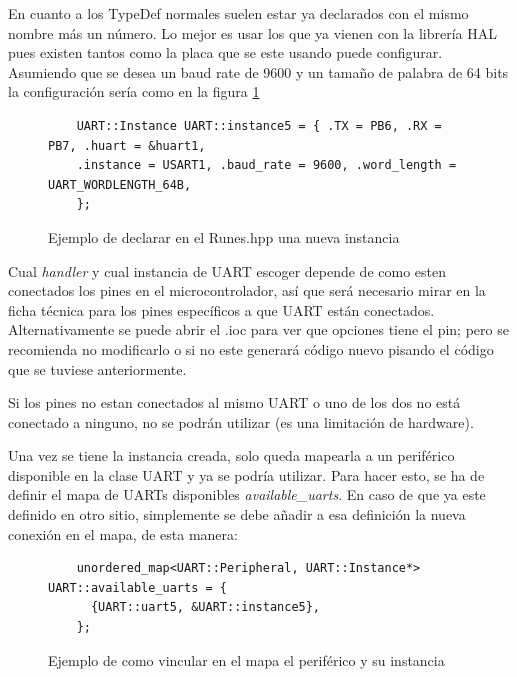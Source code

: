 \documentclass{report}
\begin{document}
En cuanto a los TypeDef normales suelen estar ya declarados con el mismo nombre más un número. Lo mejor es usar los que ya vienen con la librería HAL pues existen tantos como la placa que se este usando puede configurar. Asumiendo que se desea un baud rate de 9600 y un tamaño de palabra de 64 bits la configuración sería como en la figura \ref{UARTinstanceRunes}

\begin{figure}[h]
  \begin{lstlisting}
    UART::Instance UART::instance5 = { .TX = PB6, .RX = PB7, .huart = &huart1,
    .instance = USART1, .baud_rate = 9600, .word_length = UART_WORDLENGTH_64B,
    };
  \end{lstlisting}
\caption{Ejemplo de declarar en el Runes.hpp una nueva instancia}
\label{UARTinstanceRunes}
\end{figure}
\par \vspace{0.3cm}

Cual \textit{handler} y cual instancia de UART escoger depende de como esten conectados los pines en el microcontrolador, así que será necesario mirar en la ficha técnica para los pines específicos a que UART están conectados. Alternativamente se puede abrir el .ioc para ver que opciones tiene el pin; pero se recomienda no modificarlo o si no este generará código nuevo pisando el código que se tuviese anteriormente. 
\par 
Si los pines no estan conectados al mismo UART o uno de los dos no está conectado a ninguno, no se podrán utilizar (es una limitación de hardware).  
\par \vspace{0.3cm}
Una vez se tiene la instancia creada, solo queda mapearla a un periférico disponible en la clase UART y ya se podría utilizar. Para hacer esto, se ha de definir el mapa de UARTs disponibles \textit{available\_uarts}. En caso de que ya este definido en otro sitio, simplemente se debe añadir a esa definición la nueva conexión en el mapa, de esta manera: 

\begin{figure}[h]
  \begin{lstlisting}
    unordered_map<UART::Peripheral, UART::Instance*> UART::available_uarts = {
      {UART::uart5, &UART::instance5},
    };
  \end{lstlisting}
\caption{Ejemplo de como vincular en el mapa el periférico y su instancia}
\label{UARTavailableMap}
\end{figure}
\par \vspace{0.3cm}
\end{document}
